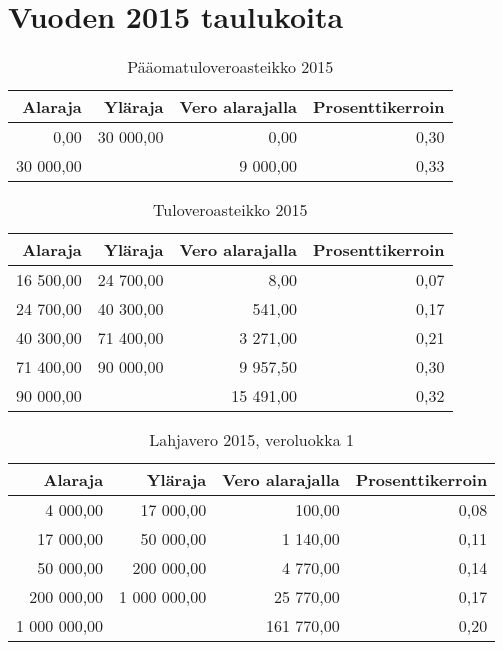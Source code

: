 \documentclass[a4paper,10pt]{article}\usepackage[]{graphicx}\usepackage[]{color}
\begin{document}
\pagestyle{empty}

\section*{Vuoden 2015 taulukoita}
\bigskip



\begin{table}[ht]
\centering
\begin{tabular}{rrrr}
  \hline
Alaraja & Yläraja & Vero alarajalla & Prosenttikerroin \\ 
  \hline
0,00 & 30 000,00 & 0,00 & 0,30 \\ 
  30 000,00 &  & 9 000,00 & 0,33 \\ 
   \hline
\end{tabular}
\caption{Pääomatuloveroasteikko 2015} 
\end{table}


\begin{table}[ht]
\centering
\begin{tabular}{rrrr}
  \hline
Alaraja & Yläraja & Vero alarajalla & Prosenttikerroin \\ 
  \hline
16 500,00 & 24 700,00 & 8,00 & 0,07 \\ 
  24 700,00 & 40 300,00 & 541,00 & 0,17 \\ 
  40 300,00 & 71 400,00 & 3 271,00 & 0,21 \\ 
  71 400,00 & 90 000,00 & 9 957,50 & 0,30 \\ 
  90 000,00 &  & 15 491,00 & 0,32 \\ 
   \hline
\end{tabular}
\caption{Tuloveroasteikko 2015} 
\end{table}


\begin{table}[ht]
\centering
\begin{tabular}{rrrr}
  \hline
Alaraja & Yläraja & Vero alarajalla & Prosenttikerroin \\ 
  \hline
4 000,00 & 17 000,00 & 100,00 & 0,08 \\ 
  17 000,00 & 50 000,00 & 1 140,00 & 0,11 \\ 
  50 000,00 & 200 000,00 & 4 770,00 & 0,14 \\ 
  200 000,00 & 1 000 000,00 & 25 770,00 & 0,17 \\ 
  1 000 000,00 &  & 161 770,00 & 0,20 \\ 
   \hline
\end{tabular}
\caption{Lahjavero 2015, veroluokka 1} 
\end{table}
\end{document}
